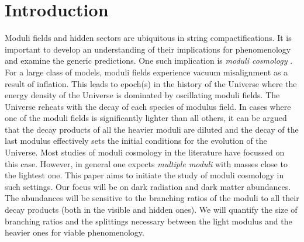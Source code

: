 \documentclass[12pt]{article}
\numberwithin{equation}{section}
\begin{document}

\newpage 
\section{Introduction}


Moduli fields and hidden sectors are ubiquitous in string compactifications. It is important to develop an understanding of their implications
for phenomenology and examine the generic predictions. One such implication is {\it moduli cosmology} \cite{mod1, mod2, modr}.
For a large class of models, moduli fields experience vacuum misalignment as a result of inflation.  This leads to epoch(s) in the history of the
Universe where the energy density of the Universe is dominated by oscillating moduli fields. The Universe reheats with the decay of each species
of modulus field. In cases where one of the moduli
fields is significantly lighter than all others, it can be argued that the decay products of all the heavier moduli are diluted and the decay of the last modulus
effectively sets the initial conditions for the evolution of the Universe.  Most studies of moduli cosmology in the literature have focussed on this case.
However, in general one expects {\it multiple moduli} with masses close to the lightest one. This paper aims  to initiate the study of
moduli cosmology in such settings.
Our focus will be on dark radiation and dark matter abundances. The abundances will be sensitive to the branching ratios of the moduli to all
their decay products (both in the visible and hidden ones). We will quantify the size of branching ratios and the splittings necessary between
the light modulus and the heavier ones for viable phenomenology. 
\end{document}
